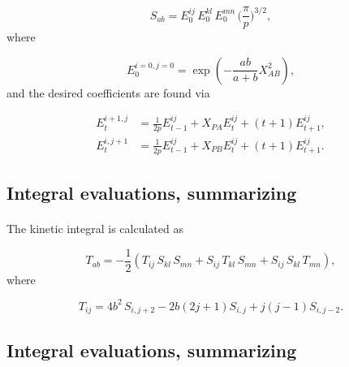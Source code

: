 \documentclass[%
twoside,                 %
final,                   %
10pt]{article}
\begin{document}
\begin{equation}
 S_{ab} = E^{ij}_0\,E^{kl}_0\,E^{mn}_0\,\Big(\frac{\pi}{p}\Big)^{3/2},
\end{equation}
where

\begin{equation}
 E^{i=0,j=0}_0 = \exp(-\frac{ab}{a+b}X_{AB}^2),
\end{equation}
and the desired coefficients are found via

\begin{equation}
\begin{split}
 E^{i+1,j}_t & = \frac{1}{2p}E^{ij}_{t-1} + X_{PA}E^{ij}_t + (t+1)E^{ij}_{t+1}, \\
 E^{i,j+1}_t & = \frac{1}{2p}E^{ij}_{t-1} + X_{PB}E^{ij}_t + (t+1)E^{ij}_{t+1}.
\end{split}
\end{equation}



\subsection{Integral evaluations, summarizing}

\paragraph{}

The kinetic integral is calculated as

\begin{equation}
 T_{ab} = -\frac{1}{2}(T_{ij}\,S_{kl}\,S_{mn} + S_{ij}\,T_{kl}\,S_{mn} + S_{ij}\,S_{kl}\,T_{mn}),
\end{equation}
where

\begin{equation}
 T_{ij} = 4b^2\,S_{i,j+2} - 2b(2j + 1)S_{i,j} + j(j-1)S_{i,j-2}.
\end{equation}



\subsection{Integral evaluations, summarizing}

\paragraph{}
\end{document}

